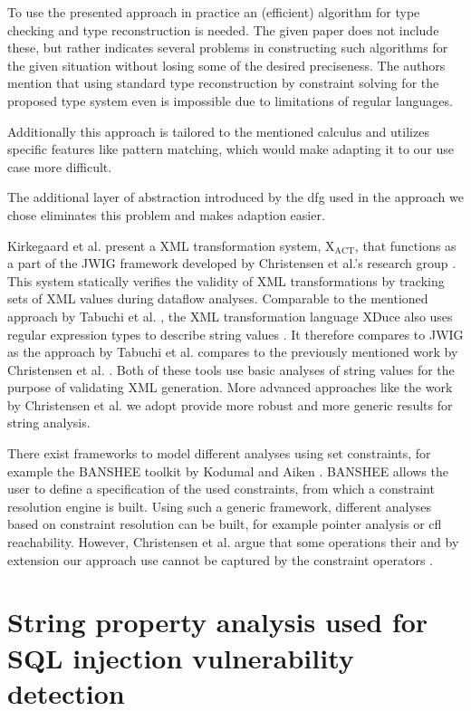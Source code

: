 To use the presented approach in practice an (efficient) algorithm for type checking and type reconstruction is needed. 
The given paper does not include these, but rather indicates several problems in constructing such algorithms for the given situation without losing some of the desired preciseness.
The authors mention that using standard type reconstruction by constraint solving for the proposed type system even is impossible due to limitations of regular languages.

Additionally this approach is tailored to the mentioned calculus and utilizes specific features like pattern matching, which would make adapting it to our use case more difficult.

The additional layer of abstraction introduced by the \ac{dfg} used in the approach we chose eliminates this problem and makes adaption easier.

Kirkegaard et al. present a XML transformation system, $\text{X}_{\text{ACT}}$, that functions as a part of the JWIG framework developed by Christensen et al.'s research group \cite{xact}. This system statically verifies the validity of XML transformations by tracking sets of XML values during dataflow analyses.
Comparable to the mentioned approach by Tabuchi et al. \cite{regex_types}, the XML transformation language XDuce also uses regular expression types to describe string values \cite{xduce}. It therefore compares to JWIG as the approach by Tabuchi et al. compares to the previously mentioned work by Christensen et al. \cite{brics}. 
Both of these tools use basic analyses of string values for the purpose of validating XML generation. More advanced approaches like the work by Christensen et al. we adopt provide more robust and more generic results for string analysis.

There exist frameworks to model different analyses using set constraints, for example the BANSHEE toolkit by Kodumal and Aiken \cite{banshee}. BANSHEE allows the user to define a specification of the used constraints, from which a constraint resolution engine is built. Using such a generic framework, different analyses based on constraint resolution can be built, for example pointer analysis or \ac{cfl} reachability. However, Christensen et al. argue that some operations their and by extension our approach use cannot be captured by the constraint operators \cite{brics}.

\section{String property analysis used for SQL injection vulnerability detection}

